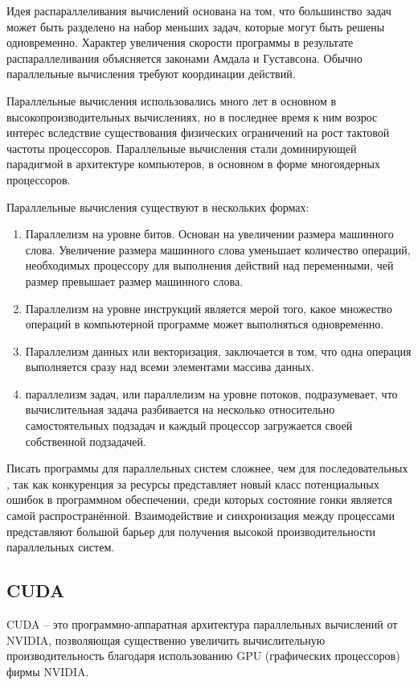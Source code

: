 Идея распараллеливания вычислений основана на том, что большинство задач может быть разделено на набор меньших задач, которые могут быть решены одновременно. Характер увеличения скорости программы в результате распараллеливания объясняется законами Амдала и Густавсона. Обычно параллельные вычисления требуют координации действий.  

Параллельные вычисления использовались много лет в основном в высокопроизводительных вычислениях, но в последнее время к ним возрос интерес вследствие существования физических ограничений на рост тактовой частоты процессоров. Параллельные вычисления стали доминирующей парадигмой в архитектуре компьютеров, в основном в форме многоядерных процессоров.\cite{bib3}

Параллельные вычисления существуют в нескольких формах: 
\begin{enumerate}
\item Параллелизм на уровне битов. Основан на увеличении размера машинного слова. Увеличение размера машинного слова уменьшает количество операций, необходимых процессору для выполнения действий над переменными, чей размер превышает размер машинного слова.
\item Параллелизм на уровне инструкций является мерой того, какое множество операций в компьютерной программе может выполняться одновременно. 
\item Параллелизм данных или векторизация, заключается в том, что одна операция выполняется сразу над всеми элементами массива данных.
\item параллелизм задач, или параллелизм на уровне потоков, подразумевает, что вычислительная задача разбивается на несколько относительно самостоятельных подзадач и каждый процессор загружается своей собственной подзадачей.
\end{enumerate}

Писать программы для параллельных систем сложнее, чем для последовательных \cite{bib4}, так как конкуренция за ресурсы представляет новый класс потенциальных ошибок в программном обеспечении, среди которых состояние гонки является самой распространённой. Взаимодействие и синхронизация между процессами представляют большой барьер для получения высокой производительности параллельных систем.

\subsection{CUDA}
CUDA – это программно-аппаратная архитектура параллельных вычислений от NVIDIA, позволяющая существенно увеличить вычислительную производительность благодаря использованию GPU (графических процессоров) фирмы NVIDIA.

